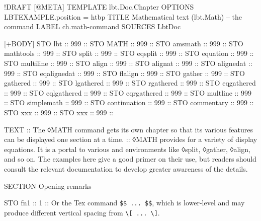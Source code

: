 \begin{lbt}
  !DRAFT
  [@META]
    TEMPLATE lbt.Doc.Chapter
    OPTIONS LBTEXAMPLE.position = htbp
    TITLE Mathematical text \textsf{(lbt.Math)} -- the  command
    LABEL ch.math-command
    SOURCES LbtDoc

  [+BODY]
    STO lbt :: 999 :: \lbtlogo{}
    STO MATH :: 999 :: 
    STO amsmath :: 999 :: 
    STO mathtools :: 999 :: 
    STO split :: 999 :: 
    STO eqsplit :: 999 :: 
    STO equation :: 999 :: 
    STO multiline :: 999 :: 
    STO align :: 999 :: 
    STO alignat :: 999 :: 
    STO alignedat :: 999 :: 
    STO eqalignedat :: 999 :: 
    STO flalign :: 999 :: 
    STO gather :: 999 :: 
    STO gathered :: 999 :: 
    STO lgathered :: 999 :: 
    STO rgathered :: 999 :: 
    STO eqgathered :: 999 :: 
    STO eqlgathered :: 999 :: 
    STO eqrgathered :: 999 :: 
    STO multline :: 999 :: 
    STO simplemath :: 999 :: 
    STO continuation :: 999 :: 
    STO commentary :: 999 :: 
    STO xxx :: 999 :: 
    STO xxx :: 999 :: 

    TEXT
    :: The ◊MATH command gets its own chapter so that its various features can be displayed one section at a time.
    :: ◊MATH provides for a variety of display equations. It is a portal to various  and  environments like ◊split, ◊gather, ◊align, and so on. The examples here give a good primer on their use, but readers should consult the relevant documentation to develop greater awareness of the details.

    SECTION Opening remarks

    STO fn1 :: 1 :: Or the Tex command \Verb|$$ ... $$|, which is lower-level and may produce different vertical spacing from \Verb|\[ ... \]|.


\end{lbt}
